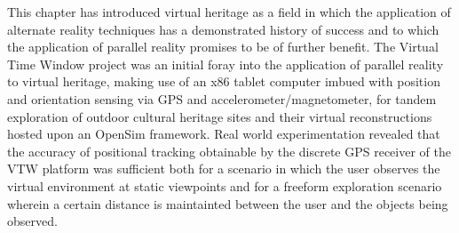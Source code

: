 This chapter has introduced virtual heritage as a field in which the application of alternate reality techniques has a demonstrated history of success and to which the application of parallel reality promises to be of further benefit. The Virtual Time Window project was an initial foray into the application of parallel reality to virtual heritage, making use of an x86 tablet computer imbued with position and orientation sensing via GPS and accelerometer/magnetometer, for tandem exploration of outdoor cultural heritage sites and their virtual reconstructions hosted upon an OpenSim framework. Real world experimentation revealed that the accuracy of positional tracking obtainable by the discrete GPS receiver of the VTW platform was sufficient both for a scenario in which the user observes the virtual environment at static viewpoints and for a freeform exploration scenario wherein a certain distance is maintainted between the user and the objects being observed. 

